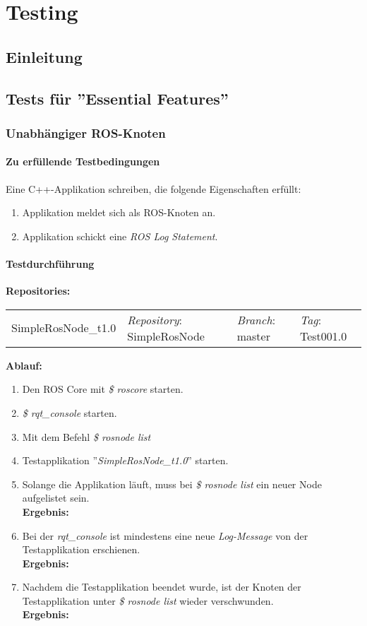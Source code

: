 \chapter{Testing}
\section{Einleitung}

\section{Tests für ''Essential Features''}
\subsection{Unabhängiger ROS-Knoten}
\subsubsection{Zu erfüllende Testbedingungen}
Eine C++-Applikation schreiben, die folgende Eigenschaften erfüllt:
\begin{enumerate}
\item Applikation meldet sich als ROS-Knoten an.
\item Applikation schickt eine \textit{ROS Log Statement}.
\end{enumerate}

\subsubsection{Testdurchführung}
\textbf{Repositories:} \\
\begin{tabular}
  { l						| l			 							l								 l								}
  SimpleRosNode\_t1.0		& \textit{Repository}: SimpleRosNode	& \textit{Branch}: master		& \textit{Tag}: Test001.0 		\\
\end{tabular}

\textbf{Ablauf: }
\begin{enumerate}
\item Den ROS Core mit \textit{\$ roscore} starten.
\item \textit{\$ rqt\_console} starten.
\item Mit dem Befehl \textit{\$ rosnode list} 
\item Testapplikation ''\textit{SimpleRosNode\_t1.0}'' starten.
\item Solange die Applikation läuft, muss bei \textit{\$ rosnode list} ein neuer Node aufgelistet sein. \\
\textbf{Ergebnis:} \checkmark
\item Bei der \textit{rqt\_console} ist mindestens eine neue \textit{Log-Message} von der Testapplikation erschienen. \\
\textbf{Ergebnis:} \checkmark
\item Nachdem die Testapplikation beendet wurde, ist der Knoten der Testapplikation unter \textit{\$ rosnode list} wieder verschwunden. \\
\textbf{Ergebnis:} \checkmark
\end{enumerate}


